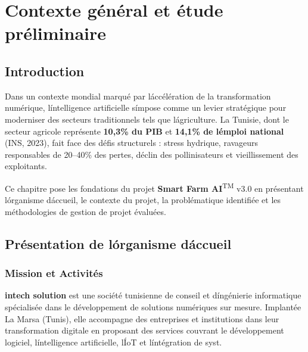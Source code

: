 \documentclass[12pt,a4paper,oneside]{report}
\newcommand{\farmAI}{\textbf{Smart Farm AI}\textsuperscript{TM}}
\begin{document}
\setcounter{page}{1}


\chapter{Contexte g\'en\'eral et \'etude pr\'eliminaire}

\section{Introduction}

Dans un contexte mondial marqu\'e par l\'acc\'el\'eration de la transformation num\'erique,
l\'intelligence artificielle s\'impose comme un levier strat\'egique pour moderniser des
secteurs traditionnels tels que l\'agriculture. La Tunisie, dont le secteur agricole
repr\'esente \textbf{10,3\% du PIB} et \textbf{14,1\% de l\'emploi national} (INS, 2023),
fait face \ des d\'efis structurels : stress hydrique, ravageurs responsables de
20--40\% des pertes, d\'eclin des pollinisateurs et vieillissement des exploitants.

Ce chapitre pose les fondations du projet \farmAI{} v3.0 en pr\'esentant l\'organisme
d\'accueil, le contexte du projet, la probl\'ematique identifi\'ee et les m\'ethodologies
de gestion de projet \'evalu\'ees.

\section{Pr\'esentation de l\'organisme d\'accueil}

\subsection{Mission et Activit\'es}

\begin{tcolorbox}[infobox,title={intech solution --- La Marsa}]
\textbf{intech solution} est une soci\'et\'e tunisienne de conseil et d\'ing\'enierie
informatique sp\'ecialis\'ee dans le d\'eveloppement de solutions num\'eriques sur mesure.
Implant\'ee \ La Marsa (Tunis), elle accompagne des entreprises et institutions dans
leur transformation digitale en proposant des services couvrant le d\'eveloppement
logiciel, l\'intelligence artificielle, l\'IoT et l\'int\'egration de syst\emes.
\end{tcolorbox}
\end{document}
